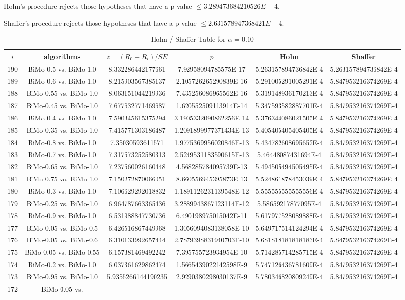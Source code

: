 \documentclass[a4paper,10pt]{article}
\begin{document}
\begin{landscape}
Holm's procedure rejects those hypotheses that have a p-value $\le3.289473684210526E-4$.


Shaffer's procedure rejects those hypotheses that have a p-value $\le2.631578947368421E-4$.


\begin{table}[!htp]
\centering\tiny
\caption{Holm / Shaffer Table for $\alpha=0.10$}
\begin{tabular}{cccccc}
$i$&algorithms&$z=(R_0 - R_i)/SE$&$p$&Holm&Shaffer\\
\hline
190&BiMo-0.5 vs. BiMo-1.0&8.332286442177661&7.92958094785575E-17&5.263157894736842E-4&5.263157894736842E-4\\189&BiMo-0.6 vs. BiMo-1.0&8.215903567385137&2.105726265290839E-16&5.291005291005291E-4&5.847953216374269E-4\\188&BiMo-0.55 vs. BiMo-1.0&8.063151044219936&7.435256086965562E-16&5.319148936170213E-4&5.847953216374269E-4\\187&BiMo-0.45 vs. BiMo-1.0&7.677632771469687&1.620552509113914E-14&5.347593582887701E-4&5.847953216374269E-4\\186&BiMo-0.4 vs. BiMo-1.0&7.590345615375294&3.1905332090862256E-14&5.376344086021505E-4&5.847953216374269E-4\\185&BiMo-0.35 vs. BiMo-1.0&7.415771303186487&1.2091899977371434E-13&5.405405405405405E-4&5.847953216374269E-4\\184&BiMo-0.8 vs. BiMo-1.0&7.35030593611571&1.9775369956020846E-13&5.434782608695652E-4&5.847953216374269E-4\\183&BiMo-0.7 vs. BiMo-1.0&7.317573252580313&2.5249531183590615E-13&5.46448087431694E-4&5.847953216374269E-4\\182&BiMo-0.65 vs. BiMo-1.0&7.237560026160448&4.568285784095739E-13&5.494505494505495E-4&5.847953216374269E-4\\181&BiMo-0.75 vs. BiMo-1.0&7.150272870066051&8.660556945395873E-13&5.524861878453039E-4&5.847953216374269E-4\\180&BiMo-0.3 vs. BiMo-1.0&7.106629292018832&1.1891126231139548E-12&5.555555555555556E-4&5.847953216374269E-4\\179&BiMo-0.25 vs. BiMo-1.0&6.964787663365436&3.2889943867123114E-12&5.58659217877095E-4&5.847953216374269E-4\\178&BiMo-0.9 vs. BiMo-1.0&6.531988847730736&6.490198975015042E-11&5.617977528089888E-4&5.847953216374269E-4\\177&BiMo-0.05 vs. BiMo-0.5&6.426516867449968&1.3056094083138058E-10&5.649717514124294E-4&5.847953216374269E-4\\176&BiMo-0.05 vs. BiMo-0.6&6.310133992657444&2.7879398831940703E-10&5.681818181818183E-4&5.847953216374269E-4\\175&BiMo-0.05 vs. BiMo-0.55&6.157381469492242&7.395755723934954E-10&5.714285714285715E-4&5.847953216374269E-4\\174&BiMo-0.2 vs. BiMo-1.0&6.037361629862474&1.5665439022142598E-9&5.747126436781609E-4&5.847953216374269E-4\\173&BiMo-0.95 vs. BiMo-1.0&5.9355266144190235&2.9290380298030137E-9&5.780346820809249E-4&5.847953216374269E-4\\172&BiMo-0.05 vs. 
\end{tabular}
\end{table}
\end{landscape}
\end{document}
